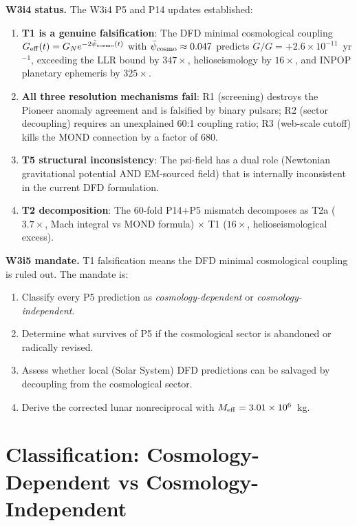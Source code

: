 \documentclass[11pt]{article}
\newcommand{\ee}[1]{\times 10^{#1}}
\newcommand{\psicosmo}{\bar{\psi}_{\rm cosmo}}
\newcommand{\Meff}{M_{\rm eff}}
\begin{document}
\noindent\textbf{W3i4 status.} The W3i4 P5 and P14 updates established:
\begin{enumerate}
\item \textbf{T1 is a genuine falsification}: The DFD minimal cosmological coupling
  $G_{\rm eff}(t) = G_N e^{-2\psicosmo(t)}$ with $\psicosmo \approx 0.047$ predicts
  $\dot{G}/G = +2.6\ee{-11}$~yr$^{-1}$, exceeding the LLR bound by $347\times$,
  helioseismology by $16\times$, and INPOP planetary ephemeris by $325\times$.
\item \textbf{All three resolution mechanisms fail}: R1 (screening) destroys the
  Pioneer anomaly agreement and is falsified by binary pulsars; R2 (sector
  decoupling) requires an unexplained 60:1 coupling ratio; R3 (web-scale
  cutoff) kills the MOND connection by a factor of 680.
\item \textbf{T5 structural inconsistency}: The psi-field has a dual role
  (Newtonian gravitational potential AND EM-sourced field) that is internally
  inconsistent in the current DFD formulation.
\item \textbf{T2 decomposition}: The 60-fold P14+P5 mismatch decomposes as
  T2a ($3.7\times$, Mach integral vs MOND formula) $\times$ T1 ($16\times$,
  helioseismological excess).
\end{enumerate}

\noindent\textbf{W3i5 mandate.} T1 falsification means the DFD minimal
cosmological coupling is ruled out. The mandate is:
\begin{enumerate}
\item Classify every P5 prediction as \emph{cosmology-dependent} or
  \emph{cosmology-independent}.
\item Determine what survives of P5 if the cosmological sector is abandoned
  or radically revised.
\item Assess whether local (Solar System) DFD predictions can be salvaged by
  decoupling from the cosmological sector.
\item Derive the corrected lunar nonreciprocal with $\Meff = 3.01\ee{6}$~kg.
\end{enumerate}

\section{Classification: Cosmology-Dependent vs Cosmology-Independent}
\label{sec:P5-classification}
\end{document}
